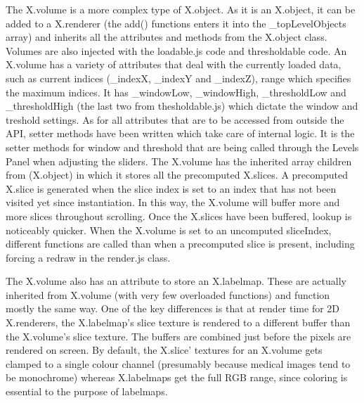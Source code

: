 \documentclass[a4paper,11pt,twoside]{article}
\begin{document}
The X.volume is a more complex type of X.object. As it is an X.object, it can be added to a X.renderer (the add() functions enters it into the \_topLevelObjects array) and inherits all the attributes and methods from the X.object class. Volumes are also injected with the loadable.js code and thresholdable code. An X.volume has a variety of attributes that deal with the currently loaded data, such as current indices (\_indexX, \_indexY and \_indexZ), range which specifies the maximum indices. It has \_windowLow, \_windowHigh, \_thresholdLow and \_thresholdHigh (the last two from thesholdable.js) which dictate the window and treshold settings. As for all attributes that are to be accessed from outside the API, setter methods have been written which take care of internal logic. It is the setter methods for window and threshold that are being called through the Levels Panel when adjusting the sliders. The X.volume has the inherited array children from (X.object) in which it stores all the precomputed X.slices. A precomputed X.slice is generated when the slice index is set to an index that has not been visited yet since instantiation. In this way, the X.volume will buffer more and more slices throughout scrolling. Once the X.slices have been buffered, lookup is noticeably quicker. When the X.volume is set to an uncomputed sliceIndex, different functions are called than when a precomputed slice is present, including forcing a redraw in the render.js class. 

The X.volume also has an attribute to store an X.labelmap. These are actually inherited from X.volume (with very few overloaded functions) and function mostly the same way. One of the key differences is that at render time for 2D X.renderers, the X.labelmap's slice texture is rendered to a different buffer than the X.volume's slice texture. The buffers are combined just before the pixels are rendered on screen. By default, the X.slice' textures for an X.volume gets clamped to a single colour channel (presumably because medical images tend to be monochrome) whereas X.labelmaps get the full RGB range, since coloring is essential to the purpose of labelmaps.
\end{document}

